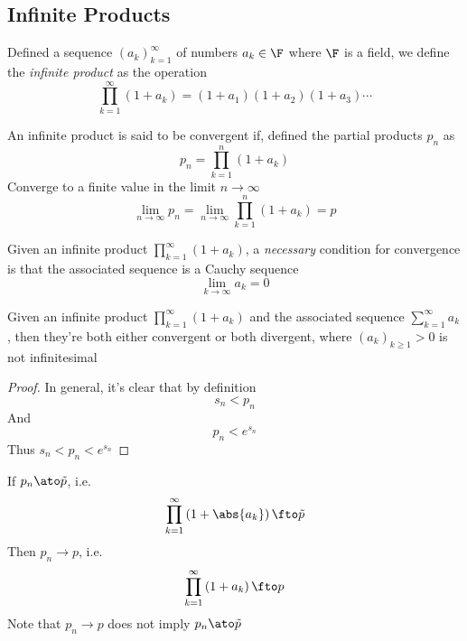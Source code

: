 \documentclass[../mmf.tex]{subfiles}
\begin{document}
\subsection{Infinite Products}
\begin{dfn}
	Defined a sequence $\left(a_k \right)_{k=1}^{\infty}$ of numbers $a_k\in\F$ where $\F$ is a field, we define the \textit{infinite product} as the operation
	\begin{equation}
		\prod_{k=1}^{\infty}\left( 1+a_k \right)=\left( 1+a_1 \right)\left( 1+a_2 \right)(1+a_3)\cdots
		\label{eq:infprod}
	\end{equation}
\end{dfn}
\begin{dfn}
	An infinite product is said to be convergent if, defined the partial products $p_n$ as
	\begin{equation}
		p_n=\prod_{k=1}^{n}\left( 1+a_k \right)
		\label{eq:partialprod}
	\end{equation}
	Converge to a finite value in the limit $n\to\infty$
	\begin{equation}
		\lim_{n\to\infty}p_n=\lim_{n\to\infty}\prod_{k=1}^{n}\left( 1+a_k \right)=p
		\label{eq:convinfprod}
	\end{equation}
\end{dfn}
\begin{lem}
	Given an infinite product $\prod_{k=1}^{\infty}\left( 1+a_k \right)$, a \textit{necessary} condition for convergence is that the associated sequence is a Cauchy sequence
	\begin{equation*}
		\lim_{k\to\infty}a_k=0
	\end{equation*}
\end{lem}
\begin{thm}
	Given an infinite product $\prod_{k=1}^{\infty}\left( 1+a_k \right)$ and the associated sequence $\sum_{k=1}^{\infty}a_k$, then they're both either convergent or both divergent, where $(a_k)_{k\ge1}>0$ is not infinitesimal
\end{thm}
\begin{proof}
	In general, it's clear that by definition
	\begin{equation*}
		s_n<p_n
	\end{equation*}
	And
	\begin{equation*}
		p_n<e^{s_n}
	\end{equation*}
	Thus $s_n<p_n<e^{s_n}$
\end{proof}
\begin{thm}
	If $p_n\ato\tilde{p}$, i.e.
	\begin{equation*}
		\prod_{k=1}^{\infty}\left( 1+\abs{a_k} \right)\fto\tilde{p}
	\end{equation*}
	Then $p_n\to p$, i.e.
	\begin{equation*}
		\prod_{k=1}^{\infty}\left( 1+a_k \right)\fto p
	\end{equation*}
	Note that $p_n\to p$ does not imply $p_n\ato\tilde{p}$
\end{thm}
\end{document}
